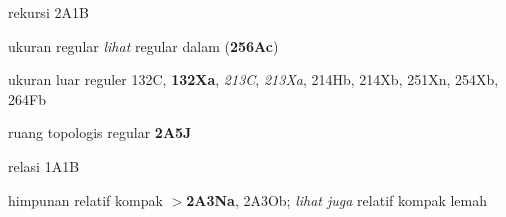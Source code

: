 

rekursi 2A1B













































ukuran regular {\it lihat} 
regular dalam ({\bf 256Ac})


















ukuran luar reguler 132C, {\bf 132Xa},
  {\it 213C}, {\it 213Xa}, 214Hb, 214Xb, 251Xn, 254Xb, 264Fb
  



ruang topologis regular {\bf 2A5J}








relasi 1A1B














himpunan relatif kompak $\pmb{>}${\bf 2A3Na}, 2A3Ob; 
  {\it lihat juga} relatif kompak lemah




















